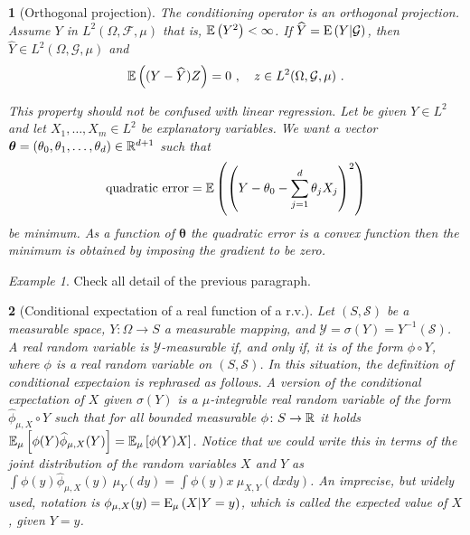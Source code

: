 \documentclass[12pt,a4paper]{amsart}
\theoremstyle{plain}%
\newtheorem{npar}{}%
\theoremstyle{definition}
\theoremstyle{remark}
\newtheorem{example}{Example}
\begin{document}
\begin{npar}[Orthogonal projection] \normalfont The conditioning operator is an \emph{orthogonal projection}. Assume $Y$ in $L^2(\Omega,\mathcal F,\mu)$ that is, $\operatorname{\mathbb E}\left(Y^2\right) < \infty$. If $\widehat Y = \operatorname{E}\left(Y \middle| \mathcal G\right)$, then $\widehat Y \in L^2(\Omega,\mathcal G,\mu)$ and
  \begin{equation*}
    \operatorname{\mathbb E}\left((Y-\widehat Y)Z\right) = 0 \ , \quad z \in L^2(\Omega,\mathcal G,\mu) \ .
  \end{equation*}

This property should not be confused with \emph{linear regression}. Let be given $Y \in L^2$ and let $X_1,\dots,X_m \in L^2$ be \emph{explanatory variables}. We want a vector $\bm \theta = (\theta_0,\theta_1,\dots,\theta_d) \in \mathbb{R}^{d+1}$ such that
\begin{equation*}
  \text{quadratic error} = \operatorname{\mathbb E}\left(\left(Y - \theta_0 - \sum_{j=1}^d \theta_j X_j\right)^2\right)
\end{equation*}
be minimum. As a function of $\bm \theta$ the quadratic error is a convex function then the minimum is obtained by imposing the gradient to be zero.
\end{npar}

\begin{example}
Check all detail of the previous paragraph.  
\end{example}

\begin{npar}[Conditional expectation of a real function of a r.v.] \normalfont
  Let $(S,\mathcal S)$ be a measurable space, $Y \colon \Omega \to S$ a measurable mapping, and $\mathcal Y = \sigma(Y) = Y^{-1}(\mathcal S)$. A real random variable is $\mathcal Y$-measurable if, and only if, it is of the form $\phi \circ Y$, where $\phi$ is a real random variable on $(S,\mathcal S)$. In this situation, the definition of conditional expectaion is rephrased as follows. A version of the conditional expectation of $X$ given $\sigma(Y)$ is a $\mu$-integrable real random variable of the form $\widehat \phi_{\mu,X} \circ Y$ such that for all bounded measurable $\phi \colon S \to \mathbb{R}$ it holds $\operatorname{\mathbb E}_{\mu}\left[\phi(Y)\widehat \phi_{\mu,X}(Y)\right] = \operatorname{\mathbb E}_{\mu}\left[\phi(Y) X\right]$. Notice that we could write this in terms of the joint distribution of the random variables $X$ and $Y$ as $\int \phi(y) \widehat \phi_{\mu,X}(y) \ \mu_Y(dy) = \int \phi(y)x \ \mu_{X,Y}(dxdy)$. An imprecise, but widely used, notation is $\phi_{\mu,X}(y) = \operatorname{E}_{\mu}\left(X \middle| Y=y\right)$, which is called the \emph{expected value of $X$, given $Y=y$}.
\end{npar}
\end{document}
